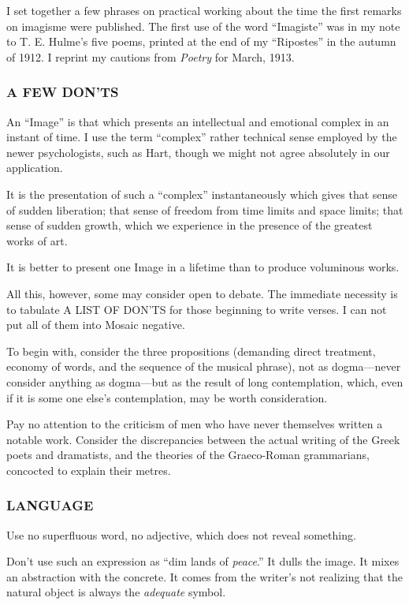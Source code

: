 I set together a few phrases on practical working about the time the
first remarks on imagisme were published. The first use of the word
``Imagiste'' was in my note to T. E. Hulme's five poems, printed at the
end of my ``Ripostes'' in the autumn of 1912. I reprint my cautions from
\emph{Poetry} for March, 1913.

\subsubsection{A FEW DON'TS}\label{a-few-donts}

An ``Image'' is that which presents an intellectual and emotional
complex in an instant of time. I use the term ``complex'' rather
technical sense employed by the newer psychologists, such as Hart,
though we might not agree absolutely in our application.

It is the presentation of such a ``complex'' instantaneously which gives
that sense of sudden liberation; that sense of freedom from time limits
and space limits; that sense of sudden growth, which we experience in
the presence of the greatest works of art.

It is better to present one Image in a lifetime than to produce
voluminous works.

All this, however, some may consider open to debate. The immediate
necessity is to tabulate A LIST OF DON'TS for those beginning to write
verses. I can not put all of them into Mosaic negative.

To begin with, consider the three propositions (demanding direct
treatment, economy of words, and the sequence of the musical phrase),
not as dogma---never consider anything as dogma---but as the result of
long contemplation, which, even if it is some one else's contemplation,
may be worth consideration.

Pay no attention to the criticism of men who have never themselves
written a notable work. Consider the discrepancies between the actual
writing of the Greek poets and dramatists, and the theories of the
Graeco-Roman grammarians, concocted to explain their metres.

\subsubsection{LANGUAGE}\label{language}

Use no superfluous word, no adjective, which does not reveal something.

Don't use such an expression as ``dim lands of \emph{peace}.'' It dulls
the image. It mixes an abstraction with the concrete. It comes from the
writer's not realizing that the natural object is always the
\emph{adequate} symbol.

